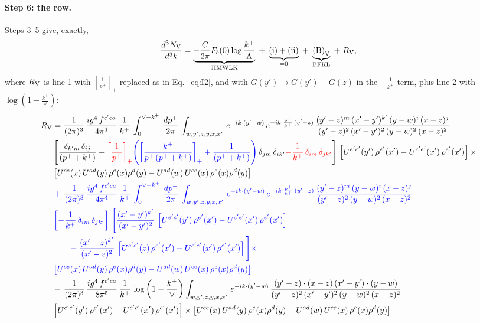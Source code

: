 \documentclass[10pt]{article}
\numberwithin{equation}{section}
\newcommand{\new}[1]{{\color{blue}#1}}
\newcommand{\old}[1]{{\color{red}#1}}
\newcommand{\nc}{\color{blue}}
\begin{document}
\paragraph{Step 6: the row.} Steps 3--5 give, exactly,
\begin{equation}
\frac{d^3N_{\rm V}}{d^3k}=\underbrace{-\frac{C}{2\pi}F_b(0)\log\frac{k^+}{\Lambda}}_{\text{JIMWLK}}\;+\;\underbrace{\text{(i)}+\text{(ii)}}_{=0}\;+\;\underbrace{\text{(B)}_{\rm V}}_{\text{BFKL}}\;+\;R_{\rm V},
\end{equation}
where $R_{\rm V}$ is line 1 with $\left[\frac{1}{p^+}\right]_+$ replaced as in Eq.~\eqref{eq:I2}, and with $G(y')\to G(y')-G(z)$ in the $-\frac{1}{k^+}$ term, plus line 2 with $\log(1-\frac{k^+}{\vee})$:
\begin{align}
R_{\rm V}&=  \frac{1}{(2\pi)^{3}}\, \frac{ig^{4}\,f^{c'ca}}{4\pi^{4}}\, \frac{1}{k^{+}}\,\int_{0}^{\vee-k^{+}}\, \frac{dp^{+}}{2\pi}\, \int_{w,y',z,y,x,x'}\, e^{-ik\cdot (y'-w)}\, e^{-ik\cdot \frac{p^{+}}{k^{+}}\,(y'-z)}\,\frac{(y'-z)^{m}\,(x'-y')^{k'}\,(y-w)^{i}\,(x-z)^{j}}{(y'-z)^{2}\,(x'-y')^{2}\,(y-w)^{2}\,(x-z)^{2}}\notag \\ & \left[\frac{\delta_{k'm}\,\delta_{ij}}{(p^{+}+k^{+})}-\old{\left[\frac{1}{p^{+}}\right]_{+}}\new{\left(\left[\frac{k^{+}}{p^{+}\,(p^{+}+k^{+})}\right]_{+}+\frac{1}{(p^{+}+k^{+})}\right)}\,\delta_{jm}\,\delta_{ik'}\old{-\frac{1}{k^{+}}\, \delta_{im}\, \delta_{jk'}}\right]\, \left[U^{e'c'}(y')\,\rho^{e'}(x')-U^{c'e'}(x')\,\rho^{e'}(x')\right]\times \notag \\ &  \left[U^{ce}(x)\,U^{ad}(y)\,\rho^{e}(x)\rho^{d}(y)-U^{ad}(w)\,U^{ce}(x)\,\rho^{e}(x)\rho^{d}(y)\right] \notag \\
& \nc  +\,\frac{1}{(2\pi)^{3}}\, \frac{ig^{4}\,f^{c'ca}}{4\pi^{4}}\, \frac{1}{k^{+}}\,\int_{0}^{\vee-k^{+}}\, \frac{dp^{+}}{2\pi}\, \int_{w,y',z,y,x,x'}\, e^{-ik\cdot (y'-w)}\, e^{-ik\cdot \frac{p^{+}}{k^{+}}\,(y'-z)}\,\frac{(y'-z)^{m}\,(y-w)^{i}\,(x-z)^{j}}{(y'-z)^{2}\,(y-w)^{2}\,(x-z)^{2}}\notag \\ & \nc  \left[-\frac{1}{k^{+}}\, \delta_{im}\, \delta_{jk'}\right]\, \Bigg[\frac{(x'-y')^{k'}}{(x'-y')^{2}}\,\left[U^{e'c'}(y')\,\rho^{e'}(x')-U^{c'e'}(x')\,\rho^{e'}(x')\right]\notag \\ & \nc  \qquad-\frac{(x'-z)^{k'}}{(x'-z)^{2}}\,\left[U^{e'c'}(z)\,\rho^{e'}(x')-U^{c'e'}(x')\,\rho^{e'}(x')\right]\Bigg]\times \notag \\ & \nc   \left[U^{ce}(x)\,U^{ad}(y)\,\rho^{e}(x)\rho^{d}(y)-U^{ad}(w)\,U^{ce}(x)\,\rho^{e}(x)\rho^{d}(y)\right] \notag \\
& -\,\frac{1}{(2\pi)^{3}}\, \frac{ig^{4}\,f^{c'ca}}{8\pi^{5}}\, \frac{1}{k^{+}}\,\log{\left(1-\frac{k^{+}}{\vee}\right)} \int_{w,y',z,y,x,x'}\, e^{-ik\cdot (y'-w)}\,\frac{(y'-z)\cdot (x-z)\,(x'-y')\cdot (y-w)}{(y'-z)^{2}\,(x'-y')^{2}\,(y-w)^{2}\,(x-z)^{2}}\notag \\ & \left[U^{e'c'}(y')\,\rho^{e'}(x')-U^{c'e'}(x')\,\rho^{e'}(x')\right]\times  \left[U^{ce}(x)\,U^{ad}(y)\,\rho^{e}(x)\rho^{d}(y)-U^{ad}(w)\,U^{ce}(x)\,\rho^{e}(x)\rho^{d}(y)\right]
\end{align}
\end{document}
